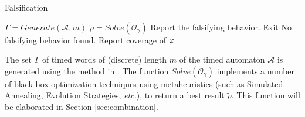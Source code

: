 \begin{algorithm}
\caption{Falsification}
\begin{algorithmic}
		\State $\Gamma = Generate(\mathcal{A},m)$
	        \ForAll{$\gamma \in \Gamma$} 
		\State $\tilde{\rho} = Solve(\mathcal{O}_{\gamma})$
		  \State Report the falsifying behavior. Exit
		\EndIf
		\EndFor
		\State No falsifying behavior found. Report coverage of $\varphi$
\end{algorithmic}
\end{algorithm}
The set $\Gamma$ of timed words of (discrete) length $m$ of the timed automaton $\mathcal{A}$ is generated using the method in \cite{BBBK16}. The function $Solve(\mathcal{O}_{\gamma})$ implements a number of black-box optimization techniques using metaheuristics (such as Simulated Annealing, Evolution Strategies, {\it etc.}), to return a best result $\tilde{\rho}$. This function will be elaborated in Section \ref{sec:combination}.



